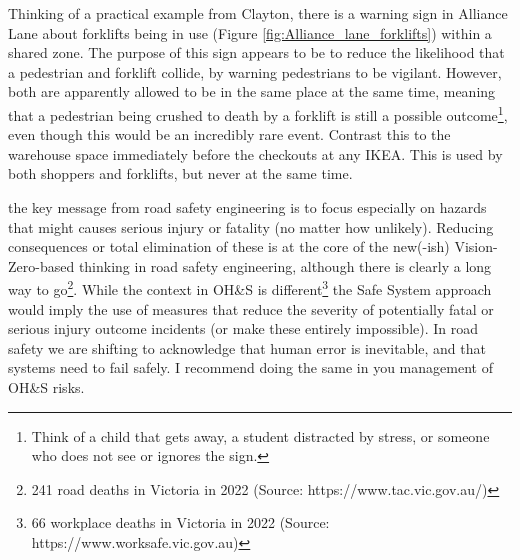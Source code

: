 \documentclass{tufte-handout}
\begin{document}
Thinking of a practical example from Clayton, there is a warning sign in Alliance Lane about forklifts being in use (Figure \ref{fig:Alliance_lane_forklifts}) within a shared zone. The purpose of this sign appears to be to reduce the likelihood that a pedestrian and forklift collide, by warning pedestrians to be vigilant. However, both are apparently allowed to be in the same place at the same time, meaning that a pedestrian being crushed to death by a forklift is still a possible outcome\footnote{Think of a child that gets away, a student distracted by stress, or someone who does not see or ignores the sign.}, even though this would be an incredibly rare event. Contrast this to the warehouse space immediately before the checkouts at any IKEA. This is used by both shoppers and forklifts, but never at the same time. 


 the key message from road safety engineering is to focus especially on hazards that might causes serious injury or fatality (no matter how unlikely). Reducing consequences or total elimination of these is at the core of the new(-ish) Vision-Zero-based thinking in road safety engineering, although there is clearly a long way to go\footnote{241 road deaths in Victoria in 2022 (Source: https://www.tac.vic.gov.au/)}. While the context in OH\&S is different\footnote{66 workplace deaths in Victoria in 2022 (Source: https://www.worksafe.vic.gov.au)} the Safe System approach would imply the use of measures that reduce the severity of potentially fatal or serious injury outcome incidents (or make these entirely impossible). In road safety we are shifting to acknowledge that human error is inevitable, and that systems need to fail safely. I recommend doing the same in you management of OH\&S risks.




\end{document}

